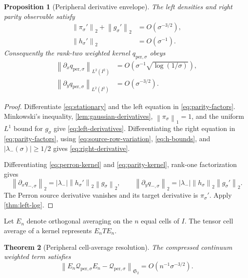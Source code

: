 \documentclass[11pt]{article}
\newtheorem{theorem}{Theorem}[section]
\newtheorem{proposition}[theorem]{Proposition}
\theoremstyle{remark}
\newcommand{\cQ}{\mathcal Q}
\newcommand{\norm}[1]{\left\lVert#1\right\rVert}
\newcommand{\HS}{\mathfrak S_2}
\newcommand{\Qper}{\cQ_{\mathrm{per},\sigma}}
\begin{document}
\begin{proposition}[Peripheral derivative envelope]
\label{prop:peripheral-derivatives}
The left densities and right parity observable satisfy
\begin{align}
 \norm{\pi_\sigma'}_2+\norm{g_\sigma'}_2
 &=O(\sigma^{-3/2}),
 \label{eq:left-derivatives}\\
 \norm{h_\sigma'}_2&=O(\sigma^{-1}).
 \label{eq:right-derivative}
\end{align}
Consequently the rank-two weighted kernel $q_{\mathrm{per},\sigma}$ obeys
\begin{align}
 \norm{\partial_x q_{\mathrm{per},\sigma}}_{L^2(I^2)}
 &=O\!\left(\sigma^{-1}\sqrt{\log(1/\sigma)}\right),
 \label{eq:q-source}\\
 \norm{\partial_y q_{\mathrm{per},\sigma}}_{L^2(I^2)}
 &=O(\sigma^{-3/2}).
 \label{eq:q-target}
\end{align}
\end{proposition}

\begin{proof}
Differentiate \eqref{eq:stationary} and the left equation in
\eqref{eq:parity-factors}.  Minkowski's inequality,
\cref{lem:gaussian-derivatives},
$\norm{\pi_\sigma}_1=1$, and the uniform $L^1$ bound for $g_\sigma$ give
\eqref{eq:left-derivatives}.  Differentiating the right equation in
\eqref{eq:parity-factors}, using \eqref{eq:source-row-variation},
\eqref{eq:h-bounds}, and $|\lambda_-(\sigma)|\ge1/2$ gives
\eqref{eq:right-derivative}.

Differentiating \eqref{eq:perron-kernel} and
\eqref{eq:parity-kernel}, rank-one factorization gives
\[
 \norm{\partial_xq_{-,\sigma}}_2
 =|\lambda_-|\norm{h_\sigma'}_2\norm{g_\sigma}_2,
 \qquad
 \norm{\partial_yq_{-,\sigma}}_2
 =|\lambda_-|\norm{h_\sigma}_2\norm{g_\sigma'}_2.
\]
The Perron source derivative vanishes and its target derivative is
$\pi_\sigma'$.  Apply \cref{thm:left-log}.
\end{proof}

Let $E_n$ denote orthogonal averaging on the $n$ equal cells of $I$.
The tensor cell average of a kernel represents $E_nTE_n$.

\begin{theorem}[Peripheral cell-average resolution]
\label{thm:peripheral-projection}
The compressed continuum weighted term satisfies
\begin{equation}
 \boxed{
 \norm{E_n\Qper E_n-\Qper}_{\HS}
 =O(n^{-1}\sigma^{-3/2}).}
 \label{eq:peripheral-projection}
\end{equation}
\end{theorem}
\end{document}
